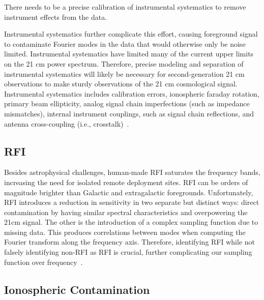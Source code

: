 	    There needs to be a precise calibration of instrumental systematics to remove instrument effects from the data.
	    
	    Instrumental systematics further complicate this effort, causing foreground signal to contaminate Fourier modes in the data that would otherwise only be noise limited. Instrumental systematics have limited many of the current upper limits on the 21 cm power spectrum. Therefore, precise modeling and separation of instrumental systematics will likely be necessary for second-generation 21 cm observations to make sturdy observations of the 21 cm cosmological signal. Instrumental systematics includes calibration errors, ionospheric faraday rotation, primary beam ellipticity, analog signal chain imperfections (such as impedance mismatches), internal instrument couplings, such as signal chain reflections, and antenna cross-coupling (i.e., crosstalk)~\citep{2020ApJ...888...70K}.
	    	    
	    \subsection*{RFI}
	    
	    Besides astrophysical challenges, human-made RFI saturates the frequency bands, increasing the need for isolated remote deployment sites. RFI can be orders of magnitude brighter than Galactic and extragalactic foregrounds. Unfortunately, RFI introduces a reduction in sensitivity in two separate but distinct ways: direct contamination by having similar spectral characteristics and overpowering the 21cm signal. The other is the introduction of a complex sampling function due to missing data.  This produces correlations between modes when computing the Fourier transform along the frequency axis. Therefore,  identifying RFI while not falsely identifying non-RFI as RFI is crucial, further complicating our sampling function over frequency~\citep{2019MNRAS.488.2605K}. 
	    
	    \subsection*{Ionospheric Contamination}
	    
